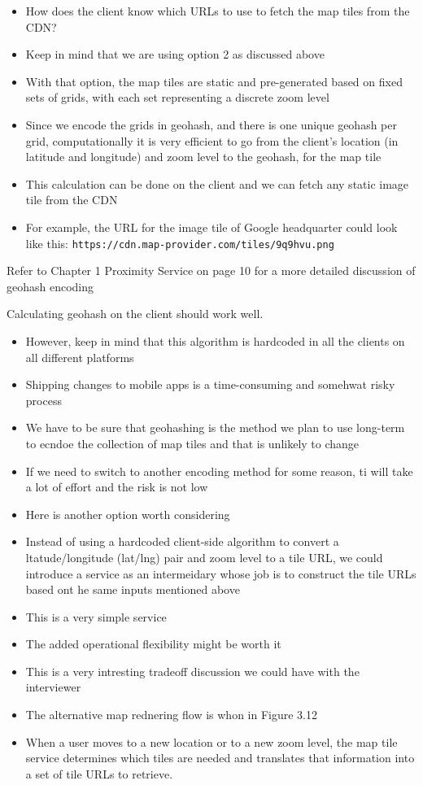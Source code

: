 \documentclass{report}
\theoremstyle{definition}
\begin{document}
\begin{itemize}
\item
How does the client know which URLs to use to fetch the map tiles from the CDN?
\item
Keep in mind that we are using option 2 as discussed above
\item
With that option, the map tiles are static and pre-generated based on fixed sets of grids, with each set representing a discrete
zoom level
\item
Since we encode the grids in geohash, and there is one unique geohash per grid, computationally it is very efficient to go from the client's location (in latitude and longitude) and zoom level to the geohash, for the map tile
\item
This calculation can be done on the client and we can fetch any static image tile from the CDN
\item
For example, the URL for the image tile of Google headquarter could look like this: \lstinline|https://cdn.map-provider.com/tiles/9q9hvu.png|
\end{itemize}

Refer to Chapter 1 Proximity Service on page 10 for a more detailed discussion of geohash encoding

Calculating geohash on the client should work well.

\begin{itemize}
\item
However, keep in mind that this algorithm is hardcoded in all the clients on all different platforms
\item
Shipping changes to mobile apps is a time-consuming and somehwat risky process
\item
We have to be sure that geohashing is the method we plan to use long-term to ecndoe the collection of map tiles and that is unlikely to change
\item
If we need to switch to another encoding method for some reason, ti will take a lot of effort and the risk is not low
\item
Here is another option worth considering
\item
Instead of using a hardcoded client-side algorithm to convert a ltatude/longitude (lat/lng) pair and zoom level to a tile URL, we could introduce a service as an intermeidary whose job is to construct the tile URLs based ont he same inputs mentioned above
\item
This is a very simple service
\item
The added operational flexibility might be worth it
\item
This is a very intresting tradeoff discussion we could have with the interviewer
\item
The alternative map rednering flow is whon in Figure 3.12
\item
When a user moves to a new location or to a new zoom level, the map tile service determines which tiles are needed and translates that information into a set of tile URLs to retrieve.
\end{itemize}
\end{document}
